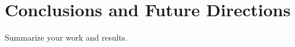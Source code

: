 
\chapter{Conclusions and Future Directions} %
Summarize your work and results.




\ifpdf
    \graphicspath{{X/figures/PNG/}{X/figures/PDF/}{X/figures/}}
\else
    \graphicspath{{X/figures/EPS/}{X/figures/}}
\fi









